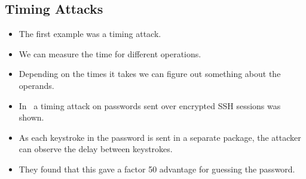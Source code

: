 \subsection{Timing Attacks}

\begin{frame}
  \begin{itemize}
    \item The first example was a timing attack.
    \item We can measure the time for different operations.
    \item Depending on the times it takes we can figure out something about the 
      operands.
  \end{itemize}
\end{frame}

\begin{frame}
  \begin{example}
    \begin{itemize}
      \item In~\cite{song2001timing} a timing attack on passwords sent over 
        encrypted SSH sessions was shown.

      \item As each keystroke in the password is sent in a separate package, 
        the attacker can observe the delay between keystrokes.

      \item They found that this gave a factor 50 advantage for guessing the 
        password.
    \end{itemize}
  \end{example}
\end{frame}

